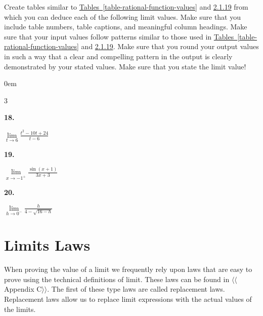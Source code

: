 \documentclass[12pt,]{book}
\theoremstyle{plain}
\theoremstyle{definition}
\numberwithin{equation}{section}
\newenvironment{exercisegroup}%
{\medskip\noindent}%
{\par\bigskip}%
\newlength{\exercisegroupindent}%
\newlength{\exercisegroupitemwidth}%
\newenvironment{exercisegrouplist}%
{\vspace{-\partopsep}%
\begin{adjustwidth}{\exercisegroupindent}{0em}}%
{\end{adjustwidth}%
\vspace{-\partopsep}%
\vspace{\baselineskip}}%
\newenvironment{exercisegroupbycol}[1]%
{\begin{exercisegrouplist}%
\vspace{-\multicolsep}%
\begin{multicols}{#1}%
\setlength{\parindent}{0em}%
\setlength{\exercisegroupitemwidth}{\linewidth}}%
{\end{multicols}%
\vspace{-\multicolsep}%
\end{exercisegrouplist}}%
\newenvironment{exercisegroupitem}[1]%
{\begin{minipage}[t]{\exercisegroupitemwidth}
\vspace{0pt}%
{\bfseries#1}%
\rule{0pt}{\baselineskip}}{\strut%
\end{minipage}%
\hspace{\columnsep}}%
\providecommand\phantomsection{}
\begin{document}
\begin{exercisegroup}%
Create tables similar to \hyperref[table-rational-function-values]{Tables~\ref*{table-rational-function-values}} and \hyperref[table-square-root-values]{2.1.19} from which you can deduce each of the following limit values. Make sure that you include table numbers, table captions, and meaningful column headings. Make sure that your input values follow patterns similar to those used in \hyperref[table-rational-function-values]{Tables~\ref*{table-rational-function-values}} and \hyperref[table-square-root-values]{2.1.19}. Make sure that you round your output values in such a way that a clear and compelling pattern in the output is clearly demonstrated by your stated values. Make sure that you state the limit value!%
\begin{exercisegroupbycol}{3}%
\begin{exercisegroupitem}{18. }\phantomsection\hypertarget{exercise-47}{\null}
\(\lim\limits_{t\to6}\frac{t^2-10t+24}{t-6}\)%
\end{exercisegroupitem}%
\par%
\begin{exercisegroupitem}{19. }\phantomsection\hypertarget{exercise-48}{\null}
\(\lim\limits_{x\to-1^{+}}\frac{\sin(x+1)}{3x+3}\)%
\end{exercisegroupitem}%
\par%
\begin{exercisegroupitem}{20. }\phantomsection\hypertarget{exercise-49}{\null}
\(\lim\limits_{h\to0^{-}}\frac{h}{4-\sqrt{16-h}}\)%
\end{exercisegroupitem}%
\par%
\end{exercisegroupbycol}%
\end{exercisegroup}%
\typeout{************************************************}
\typeout{************************************************}
\section[Limits Laws]{Limits Laws}\label{section-limit-laws}
When proving the value of a limit we frequently rely upon laws that are easy to prove using the technical definitions of limit. These laws can be found in {$\langle\langle$Appendix C$\rangle\rangle$}. The first of these type laws are called replacement laws. Replacement laws allow us to replace limit expressions with the actual values of the limits.%
\typeout{************************************************}
\typeout{************************************************}
\end{document}
